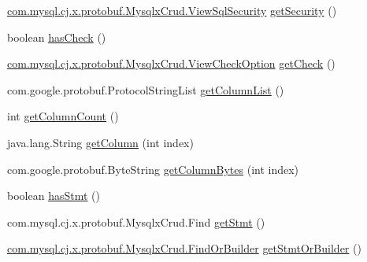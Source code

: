 \begin{DoxyCompactItemize}
\item 
\mbox{\hyperlink{enumcom_1_1mysql_1_1cj_1_1x_1_1protobuf_1_1_mysqlx_crud_1_1_view_sql_security}{com.\+mysql.\+cj.\+x.\+protobuf.\+Mysqlx\+Crud.\+View\+Sql\+Security}} \mbox{\hyperlink{interfacecom_1_1mysql_1_1cj_1_1x_1_1protobuf_1_1_mysqlx_crud_1_1_modify_view_or_builder_adf1f16ab82f70935657496c00d8ffe50}{get\+Security}} ()
\item 
boolean \mbox{\hyperlink{interfacecom_1_1mysql_1_1cj_1_1x_1_1protobuf_1_1_mysqlx_crud_1_1_modify_view_or_builder_a3b9dfc774a827d8e8c4dde033344a38e}{has\+Check}} ()
\item 
\mbox{\hyperlink{enumcom_1_1mysql_1_1cj_1_1x_1_1protobuf_1_1_mysqlx_crud_1_1_view_check_option}{com.\+mysql.\+cj.\+x.\+protobuf.\+Mysqlx\+Crud.\+View\+Check\+Option}} \mbox{\hyperlink{interfacecom_1_1mysql_1_1cj_1_1x_1_1protobuf_1_1_mysqlx_crud_1_1_modify_view_or_builder_a448027467c35ea44d2f2b7f4074883c1}{get\+Check}} ()
\item 
com.\+google.\+protobuf.\+Protocol\+String\+List \mbox{\hyperlink{interfacecom_1_1mysql_1_1cj_1_1x_1_1protobuf_1_1_mysqlx_crud_1_1_modify_view_or_builder_a9c9d94346c3ae09d73c282be2f3e7c81}{get\+Column\+List}} ()
\item 
int \mbox{\hyperlink{interfacecom_1_1mysql_1_1cj_1_1x_1_1protobuf_1_1_mysqlx_crud_1_1_modify_view_or_builder_a48e83cdbfdcb9d27e0aaae12ae05af90}{get\+Column\+Count}} ()
\item 
java.\+lang.\+String \mbox{\hyperlink{interfacecom_1_1mysql_1_1cj_1_1x_1_1protobuf_1_1_mysqlx_crud_1_1_modify_view_or_builder_ae853e4a7b855ba3afc76daaaab011bdc}{get\+Column}} (int index)
\item 
com.\+google.\+protobuf.\+Byte\+String \mbox{\hyperlink{interfacecom_1_1mysql_1_1cj_1_1x_1_1protobuf_1_1_mysqlx_crud_1_1_modify_view_or_builder_aa38e5af119f7ff9b3c5c9076c4ec1f9d}{get\+Column\+Bytes}} (int index)
\item 
boolean \mbox{\hyperlink{interfacecom_1_1mysql_1_1cj_1_1x_1_1protobuf_1_1_mysqlx_crud_1_1_modify_view_or_builder_affca976a6afc393aff2d0a7106de0e54}{has\+Stmt}} ()
\item 
com.\+mysql.\+cj.\+x.\+protobuf.\+Mysqlx\+Crud.\+Find \mbox{\hyperlink{interfacecom_1_1mysql_1_1cj_1_1x_1_1protobuf_1_1_mysqlx_crud_1_1_modify_view_or_builder_a12b635ed3764d7382a20bffc83ca4688}{get\+Stmt}} ()
\item 
\mbox{\hyperlink{interfacecom_1_1mysql_1_1cj_1_1x_1_1protobuf_1_1_mysqlx_crud_1_1_find_or_builder}{com.\+mysql.\+cj.\+x.\+protobuf.\+Mysqlx\+Crud.\+Find\+Or\+Builder}} \mbox{\hyperlink{interfacecom_1_1mysql_1_1cj_1_1x_1_1protobuf_1_1_mysqlx_crud_1_1_modify_view_or_builder_aaae1eefb7a1d0c5b7c7fabd249b6f5fb}{get\+Stmt\+Or\+Builder}} ()
\end{DoxyCompactItemize}


